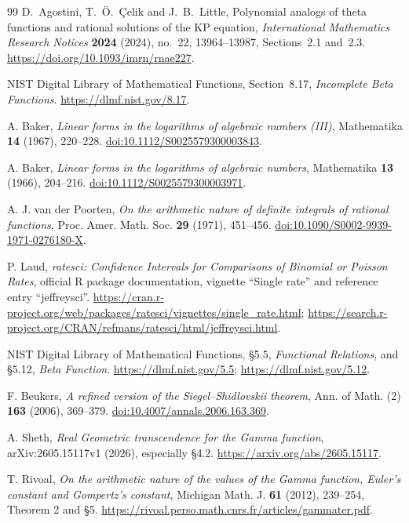 \documentclass[11pt,a4paper]{article}
\theoremstyle{definition}
\theoremstyle{remark}
\numberwithin{equation}{section}
\begin{document}
\begin{thebibliography}{99}
D.~Agostini, T.~\"O.~\c{C}elik and J.~B.~Little,
Polynomial analogs of theta functions and rational solutions of the KP
equation, \emph{International Mathematics Research Notices}
\textbf{2024} (2024), no.~22, 13964--13987, Sections~2.1 and~2.3.
\url{https://doi.org/10.1093/imrn/rnae227}.

NIST Digital Library of Mathematical Functions, Section~8.17,
\emph{Incomplete Beta Functions}.
\url{https://dlmf.nist.gov/8.17}.

A. Baker, \emph{Linear forms in the logarithms of algebraic numbers
(III)}, Mathematika \textbf{14} (1967), 220--228.
\href{https://doi.org/10.1112/S0025579300003843}{doi:10.1112/S0025579300003843}.

A. Baker, \emph{Linear forms in the logarithms of algebraic numbers},
Mathematika \textbf{13} (1966), 204--216.
\href{https://doi.org/10.1112/S0025579300003971}{doi:10.1112/S0025579300003971}.

A. J. van der Poorten, \emph{On the arithmetic nature of definite
integrals of rational functions}, Proc. Amer. Math. Soc. \textbf{29}
(1971), 451--456.
\href{https://doi.org/10.1090/S0002-9939-1971-0276180-X}{doi:10.1090/S0002-9939-1971-0276180-X}.

P. Laud, \emph{ratesci: Confidence Intervals for Comparisons of
Binomial or Poisson Rates}, official R package documentation,
vignette ``Single rate'' and reference entry ``jeffreysci''.
\url{https://cran.r-project.org/web/packages/ratesci/vignettes/single_rate.html};
\url{https://search.r-project.org/CRAN/refmans/ratesci/html/jeffreysci.html}.

NIST Digital Library of Mathematical Functions,
\S5.5, \emph{Functional Relations}, and \S5.12, \emph{Beta Function}.
\url{https://dlmf.nist.gov/5.5}; \url{https://dlmf.nist.gov/5.12}.

F. Beukers, \emph{A refined version of the Siegel--Shidlovskii theorem},
Ann. of Math. (2) \textbf{163} (2006), 369--379.
\href{https://doi.org/10.4007/annals.2006.163.369}{doi:10.4007/annals.2006.163.369}.

A. Sheth,
\emph{Real Geometric transcendence for the Gamma function},
arXiv:2605.15117v1 (2026), especially \S4.2.
\url{https://arxiv.org/abs/2605.15117}.

T. Rivoal,
\emph{On the arithmetic nature of the values of the Gamma function,
Euler's constant and Gompertz's constant},
Michigan Math. J. \textbf{61} (2012), 239--254,
Theorem 2 and \S5.
\url{https://rivoal.perso.math.cnrs.fr/articles/gammater.pdf}.


\end{thebibliography}
\end{document}
